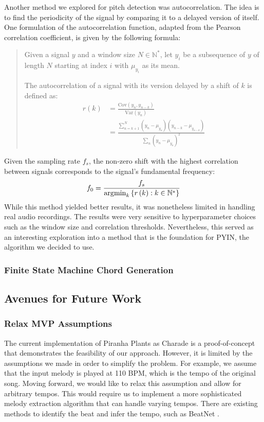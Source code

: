 Another method we explored for pitch detection was autocorrelation. The idea is to find the periodicity of the signal by comparing it to a delayed version of itself. One formulation of the autocorrelation function, adapted from the Pearson correlation coefficient, is given by the following formula:
\begin{quote}
    Given a signal $y$ and a window size $N \in \mathbb N^\ast$, let $y_i$ be a subsequence of $y$ of length $N$ starting at index $i$ with $\mu_{y_i}$ as its mean.

    The autocorrelation of a signal with its version delayed by a shift of $k$ is defined as:
    \begin{align*}
        r\left(k\right)
        &= \frac{\text{Cov}\left(y_n, y_{n-k}\right)}{\text{Var}\left(y_n\right)} \\
        &= \frac{\sum_{n=k+1}^N \left(y_n - \mu_{y_n}\right) \left(y_{n-k} - \mu_{y_{n-k}}\right)}{\sum_n \left(y_n - \mu_{y_n}\right)^2}
    \end{align*}
\end{quote}
Given the sampling rate $f_s$, the non-zero shift with the highest correlation between signals corresponds to the signal's fundamental frequency:
$$f_0 = \frac{f_s}{\operatorname*{\arg\!\min}_{k}\left\{ r\left(k\right) : k \in \mathbb N^\ast \right\}}$$
While this method yielded better results, it was nonetheless limited in handling real audio recordings. The results were very sensitive to hyperparameter choices such as the window size and correlation thresholds. Nevertheless, this served as an interesting exploration into a method that is the foundation for PYIN, the algorithm we decided to use.

\subsubsection{Finite State Machine Chord Generation}

\subsection{Avenues for Future Work}
\label{sec:avenues}

\subsubsection{Relax MVP Assumptions}

The current implementation of Piranha Plants as Charade is a proof-of-concept that demonstrates the feasibility of our approach. However, it is limited by the assumptions we made in order to simplify the problem. For example, we assume that the input melody is played at 110 BPM, which is the tempo of the original song. Moving forward, we would like to relax this assumption and allow for arbitrary tempos. This would require us to implement a more sophisticated melody extraction algorithm that can handle varying tempos. There are existing methods to identify the beat and infer the tempo, such as BeatNet \cite{BeatNet:2021}.


